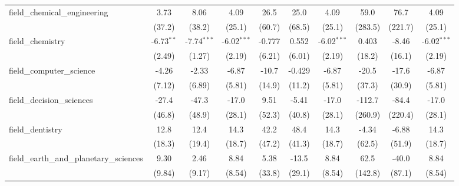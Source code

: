 \begin{tabular}{lccccccccc}
   field\_chemical\_engineering                                & 3.73         & 8.06          & 4.09          & 26.5        & 25.0         & 4.09          & 59.0      & 76.7    & 4.09\\   
                                                               & (37.2)       & (38.2)        & (25.1)        & (60.7)      & (68.5)       & (25.1)        & (283.5)   & (221.7) & (25.1)\\   
   field\_chemistry                                            & -6.73$^{**}$ & -7.74$^{***}$ & -6.02$^{***}$ & -0.777      & 0.552        & -6.02$^{***}$ & 0.403     & -8.46   & -6.02$^{***}$\\   
                                                               & (2.49)       & (1.27)        & (2.19)        & (6.21)      & (6.01)       & (2.19)        & (18.2)    & (16.1)  & (2.19)\\   
   field\_computer\_science                                    & -4.26        & -2.33         & -6.87         & -10.7       & -0.429       & -6.87         & -20.5     & -17.6   & -6.87\\   
                                                               & (7.12)       & (6.89)        & (5.81)        & (14.9)      & (11.2)       & (5.81)        & (37.3)    & (30.9)  & (5.81)\\   
   field\_decision\_sciences                                   & -27.4        & -47.3         & -17.0         & 9.51        & -5.41        & -17.0         & -112.7    & -84.4   & -17.0\\   
                                                               & (46.8)       & (48.9)        & (28.1)        & (52.3)      & (40.8)       & (28.1)        & (260.9)   & (220.4) & (28.1)\\   
   field\_dentistry                                            & 12.8         & 12.4          & 14.3          & 42.2        & 48.4         & 14.3          & -4.34     & -6.88   & 14.3\\   
                                                               & (18.3)       & (19.4)        & (18.7)        & (47.2)      & (41.3)       & (18.7)        & (62.5)    & (51.9)  & (18.7)\\   
   field\_earth\_and\_planetary\_sciences                      & 9.30         & 2.46          & 8.84          & 5.38        & -13.5        & 8.84          & 62.5      & -40.0   & 8.84\\   
                                                               & (9.84)       & (9.17)        & (8.54)        & (33.8)      & (29.1)       & (8.54)        & (142.8)   & (87.1)  & (8.54)\\   

\end{tabular}
